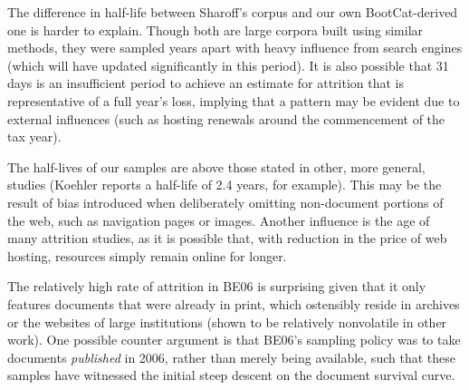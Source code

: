 The difference in half-life between Sharoff's corpus and our own BootCat-derived one is harder to explain.  Though both are large corpora built using similar methods, they were sampled years apart with heavy influence from search engines (which will have updated significantly in this period).  It is also possible that 31 days is an insufficient period to achieve an estimate for attrition that is representative of a full year's loss, implying that a pattern may be evident due to external influences (such as hosting renewals around the commencement of the tax year).%


The half-lives of our samples are above those stated in other, more general, studies (Koehler reports a half-life of 2.4 years, for example).
This may be the result of bias introduced when deliberately omitting non-document portions of the web, such as navigation pages or images.  Another influence is the age of many attrition studies, as it is possible that, with reduction in the price of web hosting, resources simply remain online for longer.


The relatively high rate of attrition in BE06 is surprising given that it only features documents that were already in print, which ostensibly reside in archives or the websites of large institutions (shown to be relatively nonvolatile in other work).  One possible counter argument is that BE06's sampling policy was to take documents \textsl{published} in 2006, rather than merely being available, such that these samples have witnessed the initial steep descent on the document survival curve. %


